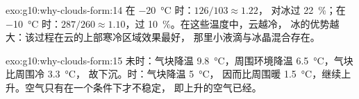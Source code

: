 \begin{solution}{exo:g10:why-clouds-form:14}
在 \qty{-20}{\degreeCelsius} 时：$126/103 \approx 1.22$，
对冰过 \qty{22}{\percent}；在 \qty{-10}{\degreeCelsius} 时：$287/260 \approx
1.10$，过 \qty{10}{\percent}。在这些温度中，云越冷，
冰的优势越大：该过程在云的上部寒冷区域效果最好，
那里小液滴与冰晶混合存在。
\end{solution}

\begin{solution}{exo:g10:why-clouds-form:15}
未时：气块降温 \qty{9.8}{\degreeCelsius}，周围环境降温
\qty{6.5}{\degreeCelsius}，气块比周围冷 \qty{3.3}{\degreeCelsius}，
故下沉。时：气块降温 \qty{5}{\degreeCelsius}，
因而比周围暖 \qty{1.5}{\degreeCelsius}，继续上升。空气只有在一个条件下才不稳定，
即上升的空气已经。
\end{solution}

